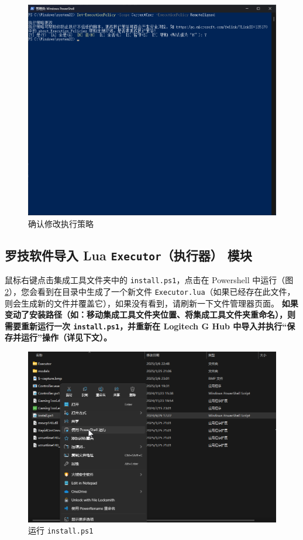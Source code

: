 \begin{figure}[H]
    \Centering
    \includegraphics[width=\textwidth]{assets/intro/confirm_execution_policy_01.png}
    \caption{确认修改执行策略}
    \label{ch0fig-confirm-execution-policy}
\end{figure}

\subsection{罗技软件导入 Lua \lstinline{Executor}（执行器） 模块}

鼠标右键点击集成工具文件夹中的 \lstinline{install.ps1}，点击在 Powershell 中运行（图 \ref{ch0fig-run-install-script}），您会看到在目录中生成了一个新文件 \lstinline{Executor.lua}（如果已经存在此文件，则会生成新的文件并覆盖它），如果没有看到，请刷新一下文件管理器页面。
\textbf{\color{red} 如果变动了安装路径（如：移动集成工具文件夹位置、将集成工具文件夹重命名），则需要重新运行一次 \lstinline{install.ps1}，并重新在 Logitech G Hub 中导入并执行“保存并运行”操作（详见下文）。}

\begin{figure}[H]
    \Centering
    \includegraphics[width=\textwidth]{assets/intro/install.png}
    \caption{运行 \lstinline{install.ps1}}
    \label{ch0fig-run-install-script}
\end{figure}

